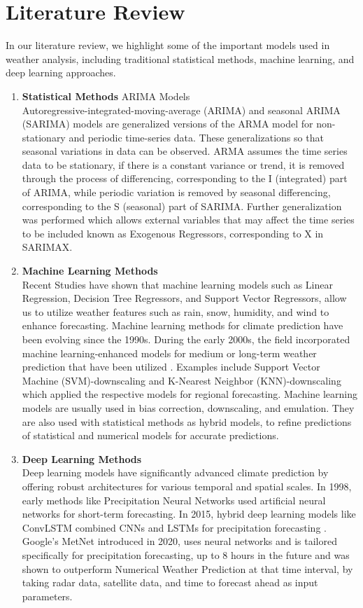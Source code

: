 \documentclass[12pt, a4paper]{article}
\begin{document}
\section{Literature Review}
In our literature review, we highlight some of the important models used in weather analysis, including traditional statistical methods, machine learning, and deep learning approaches.
\begin{enumerate}
    \item \textbf{Statistical Methods}
        \subitem ARIMA Models\\
        Autoregressive-integrated-moving-average (ARIMA) and seasonal ARIMA (SARIMA) models are generalized versions of the ARMA model for non-stationary and periodic time-series data. These generalizations so that seasonal variations in data can be observed. ARMA assumes the time series data to be stationary, if there is a constant variance or trend, it is removed through the process of differencing, corresponding to the I (integrated) part of ARIMA, while periodic variation is removed by seasonal differencing, corresponding to the S (seasonal) part of SARIMA. Further generalization was performed which allows external variables that may affect the time series to be included known as Exogenous Regressors, corresponding to X in SARIMAX. \cite{wikipediaAutoregressiveIntegrated, geeksforgeeksCompleteGuide}
    \item \textbf{Machine Learning Methods}\\
        Recent Studies have shown that machine learning models such as Linear Regression, Decision Tree Regressors, and Support Vector Regressors, allow us to utilize weather features such as rain, snow, humidity, and wind to enhance forecasting. Machine learning methods for climate prediction have been evolving since the 1990s. During the early 2000s, the field incorporated machine learning-enhanced models for medium or long-term weather prediction that have been utilized \cite{app132112019}. Examples include Support Vector Machine (SVM)-downscaling and K-Nearest Neighbor (KNN)-downscaling which applied the respective models for regional forecasting. Machine learning models are usually used in bias correction, downscaling, and emulation. They are also used with statistical methods as hybrid models, to refine predictions of statistical and numerical models for accurate predictions.
    \item \textbf{Deep Learning Methods}\\
        Deep learning models have significantly advanced climate prediction by offering robust architectures for various temporal and spatial scales. In 1998, early methods like Precipitation Neural Networks used artificial neural networks for short-term forecasting. In 2015, hybrid deep learning models like ConvLSTM combined CNNs and LSTMs for precipitation forecasting \cite{app132112019}. Google's MetNet \cite{metnet} introduced in 2020, uses neural networks and is tailored specifically for precipitation forecasting, up to 8 hours in the future and was shown to outperform Numerical Weather Prediction at that time interval, by taking radar data, satellite data, and time to forecast ahead as input parameters.
\end{enumerate}
\end{document}
